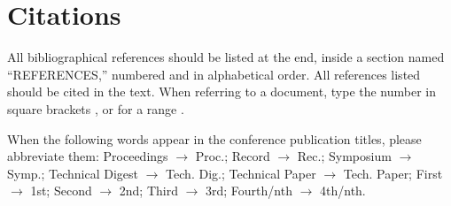 \documentclass{article}
\begin{document}
\section{Citations}

All bibliographical references should be listed at the end,
inside a section named ``REFERENCES,'' numbered and in alphabetical order.
All references listed should be cited in the text.
When referring to a document, type the number in square brackets
\cite{Author:00}, or for a range \cite{Author:00,Someone:10,Someone:04}.

When the following words appear in the conference publication titles, please abbreviate them: Proceedings $\rightarrow$ Proc.; Record $\rightarrow$ Rec.; Symposium $\rightarrow$ Symp.; Technical Digest $\rightarrow$ Tech. Dig.; Technical Paper $\rightarrow$ Tech. Paper; First $\rightarrow$ 1st; Second $\rightarrow$ 2nd; Third $\rightarrow$ 3rd; Fourth/nth $\rightarrow$ 4th/nth.





%
%
%
%
\end{document}

